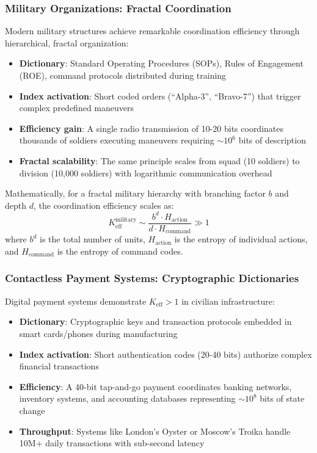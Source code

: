 \documentclass[11pt,a4paper]{article}
\begin{document}
	\subsubsection{Military Organizations: Fractal Coordination}
	Modern military structures achieve remarkable coordination efficiency through hierarchical, fractal organization:
	\begin{itemize}
		\item \textbf{Dictionary}: Standard Operating Procedures (SOPs), Rules of Engagement (ROE), command protocols distributed during training
		\item \textbf{Index activation}: Short coded orders (``Alpha-3'', ``Bravo-7'') that trigger complex predefined maneuvers
		\item \textbf{Efficiency gain}: A single radio transmission of 10-20 bits coordinates thousands of soldiers executing maneuvers requiring $\sim 10^6$ bits of description
		\item \textbf{Fractal scalability}: The same principle scales from squad (10 soldiers) to division (10,000 soldiers) with logarithmic communication overhead
	\end{itemize}
	
	Mathematically, for a fractal military hierarchy with branching factor $b$ and depth $d$, the coordination efficiency scales as:
	\begin{equation}
		K_{\mathrm{eff}}^{\text{military}} \sim \frac{b^d \cdot H_{\text{action}}}{d \cdot H_{\text{command}}} \gg 1
	\end{equation}
	where $b^d$ is the total number of units, $H_{\text{action}}$ is the entropy of individual actions, and $H_{\text{command}}$ is the entropy of command codes.
	
	\subsubsection{Contactless Payment Systems: Cryptographic Dictionaries}
	Digital payment systems demonstrate $K_{\mathrm{eff}} > 1$ in civilian infrastructure:
	\begin{itemize}
		\item \textbf{Dictionary}: Cryptographic keys and transaction protocols embedded in smart cards/phones during manufacturing
		\item \textbf{Index activation}: Short authentication codes (20-40 bits) authorize complex financial transactions
		\item \textbf{Efficiency}: A 40-bit tap-and-go payment coordinates banking networks, inventory systems, and accounting databases representing $\sim 10^8$ bits of state change
		\item \textbf{Throughput}: Systems like London's Oyster or Moscow's Troika handle 10M+ daily transactions with sub-second latency
	\end{itemize}
	
\end{document}
